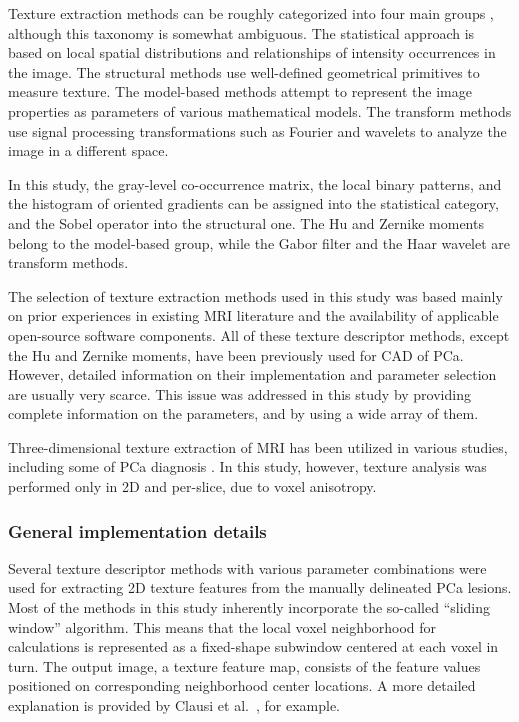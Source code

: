 \documentclass[10pt,letterpaper]{article}
\newcommand{\citep}{\cite}
\begin{document}
Texture extraction methods can be roughly categorized into four main groups
\citep{Castellano2004}, although this taxonomy is somewhat ambiguous. The
statistical approach is based on local spatial distributions and relationships
of intensity occurrences in the image. The structural methods use well-defined
geometrical primitives to measure texture. The model-based methods attempt to
represent the image properties as parameters of various mathematical models. The
transform methods use signal processing transformations such as Fourier and
wavelets to analyze the image in a different space.

In this study, the gray-level co-occurrence matrix, the local binary patterns,
and the histogram of oriented gradients can be assigned into the statistical
category, and the Sobel operator into the structural one. The Hu and Zernike
moments belong to the model-based group, while the Gabor filter and the Haar
wavelet are transform methods.

The selection of texture extraction methods used in this study was based mainly
on prior experiences in existing MRI literature \citep{Castellano2004,
Lemaitre2015} and the availability of applicable open-source software
components. All of these texture descriptor methods, except the Hu and Zernike
moments, have been previously used for CAD of PCa. However, detailed information
on their implementation and parameter selection are usually very scarce. This
issue was addressed in this study by providing complete information on the
parameters, and by using a wide array of them.

Three-dimensional texture extraction of MRI has been utilized in various
studies, including some of PCa diagnosis \citep{Depeursinge2014}. In this study,
however, texture analysis was performed only in 2D and per-slice, due to voxel
anisotropy.

\subsubsection{General implementation details}

Several texture descriptor methods with various parameter combinations were used
for extracting 2D texture features from the manually delineated PCa lesions.
Most of the methods in this study inherently incorporate the so-called ``sliding
window'' algorithm. This means that the local voxel neighborhood for
calculations is represented as a fixed-shape subwindow centered at each voxel in
turn. The output image, a texture feature map, consists of the feature values
positioned on corresponding neighborhood center locations. A more detailed
explanation is provided by Clausi et al.\ \cite{Clausi2002Rapid}, for example.
\end{document}
